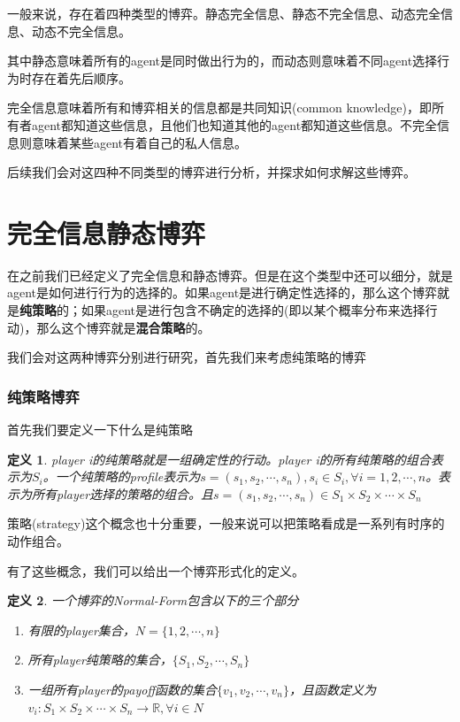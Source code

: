 \documentclass[UTF8,12pt]{ctexart}
\newtheorem{Def}{定义}[section]
\numberwithin{equation}{section} %
\numberwithin{figure}{section}
\numberwithin{table}{section}
\begin{document}
	一般来说，存在着四种类型的博弈。静态完全信息、静态不完全信息、动态完全信息、动态不完全信息。
	
	其中静态意味着所有的agent是同时做出行为的，而动态则意味着不同agent选择行为时存在着先后顺序。
	
	完全信息意味着所有和博弈相关的信息都是共同知识(common knowledge)，即所有者agent都知道这些信息，且他们也知道其他的agent都知道这些信息。不完全信息则意味着某些agent有着自己的私人信息。
	
	后续我们会对这四种不同类型的博弈进行分析，并探求如何求解这些博弈。
	
	\newpage
	
	\part{完全信息静态博弈}
	在之前我们已经定义了完全信息和静态博弈。但是在这个类型中还可以细分，就是agent是如何进行行为的选择的。如果agent是进行确定性选择的，那么这个博弈就是\textbf{纯策略}的；如果agent是进行包含不确定的选择的(即以某个概率分布来选择行动)，那么这个博弈就是\textbf{混合策略}的。
	
	我们会对这两种博弈分别进行研究，首先我们来考虑纯策略的博弈
	
	\section{纯策略博弈}
	首先我们要定义一下什么是纯策略
	\begin{Def}
		player i的纯策略就是一组确定性的行动。player i的所有纯策略的组合表示为$S_i$。一个纯策略的profile表示为$s = (s_1,s_2,\cdots,s_n),s_i \in S_i,\forall i = 1,2,\cdots,n$。表示为所有player选择的策略的组合。且$s = (s_1,s_2,\cdots,s_n) \in S_1 \times S_2 \times \cdots \times S_n$
	\end{Def}
	
	策略(strategy)这个概念也十分重要，一般来说可以把策略看成是一系列有时序的动作组合。
	
	有了这些概念，我们可以给出一个博弈形式化的定义。
	\begin{Def}
		一个博弈的Normal-Form包含以下的三个部分
		\begin{enumerate}
			\item 有限的player集合，$N = \{1,2,\cdots,n\}$
			
			\item 所有player纯策略的集合，$\{S_1,S_2,\cdots,S_n\}$
			
			\item 一组所有player的payoff函数的集合$\{v_1,v_2,\cdots,v_n\}$，且函数定义为$v_i:S_1 \times S_2 \times \cdots \times S_n \rightarrow \mathbb{R},\forall i \in N$
		\end{enumerate}
	\end{Def}
	
\end{document}

